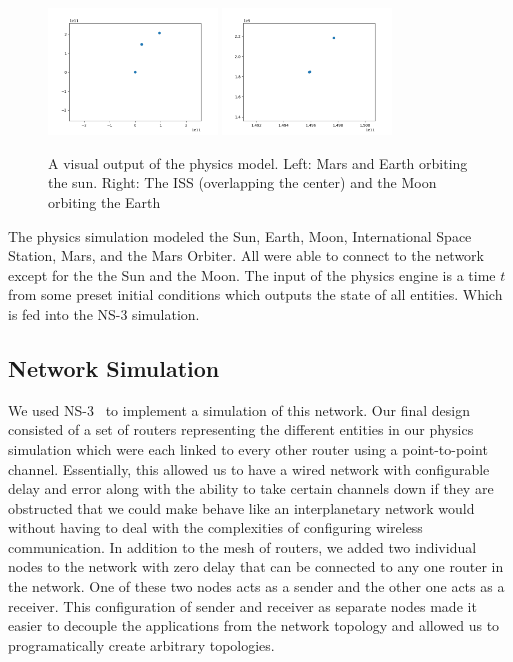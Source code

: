\documentclass[a4paper,12pt]{article}
\begin{document}
\begin{figure}[h]
  \centering
  \includegraphics[width=0.4\textwidth]{media/sun_orbit.png}
  \includegraphics[width=0.4\textwidth]{media/moon_orbit.png}
  \caption{A visual output of the physics model. Left: Mars and Earth orbiting the sun. Right: The ISS (overlapping the center) and the Moon orbiting the Earth}
\end{figure}

The physics simulation modeled the Sun, Earth, Moon, International Space Station,
Mars, and the Mars Orbiter. All were able to connect to the network except for the 
the Sun and the Moon. The input of the physics engine is a time $t$ from some preset initial conditions
which outputs the state of all entities. Which is fed into the NS-3 simulation.

\subsection{Network Simulation}

We used NS-3~\cite{ns-3} to implement a simulation of this network. Our final
design consisted of a set of routers representing the different entities in our
physics simulation which were each linked to every other router using a
point-to-point channel. Essentially, this allowed us to have a wired network
with configurable delay and error along with the ability to take certain
channels down if they are obstructed that we could make behave like an
interplanetary network would without having to deal with the complexities of
configuring wireless communication. In addition to the mesh of routers, we added
two individual nodes to the network with zero delay that can be connected to any
one router in the network. One of these two nodes acts as a sender and the other
one acts as a receiver. This configuration of sender and receiver as separate
nodes made it easier to decouple the applications from the network topology and
allowed us to programatically create arbitrary topologies.
\end{document}
